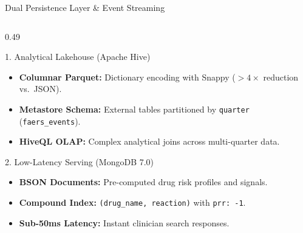 \documentclass[11pt, aspectratio=169]{beamer}
\begin{document}
\begin{frame}{Dual Persistence Layer \& Event Streaming}
\footnotesize
\begin{columns}[T]
  \begin{column}{0.49\textwidth}
    \begin{block}{\footnotesize 1. Analytical Lakehouse (Apache Hive)}
      \scriptsize
      \begin{itemize}\scriptsize
        \item \textbf{Columnar Parquet:} Dictionary encoding with Snappy ($>4\times$ reduction vs.\ JSON).
        \item \textbf{Metastore Schema:} External tables partitioned by \texttt{quarter} (\texttt{faers\_events}).
        \item \textbf{HiveQL OLAP:} Complex analytical joins across multi-quarter data.
      \end{itemize}
    \end{block}
    \vspace{0.01cm}
    \begin{block}{\footnotesize 2. Low-Latency Serving (MongoDB 7.0)}
      \scriptsize
      \begin{itemize}\scriptsize
        \item \textbf{BSON Documents:} Pre-computed drug risk profiles and signals.
        \item \textbf{Compound Index:} \texttt{(drug\_name, reaction)} with \texttt{prr: -1}.
        \item \textbf{Sub-50ms Latency:} Instant clinician search responses.
      \end{itemize}
    \end{block}
  \end{column}


\end{columns}
\end{frame}
\end{document}
